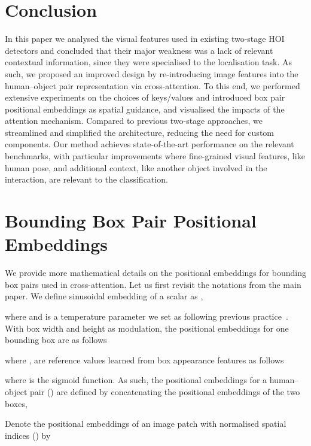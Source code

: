 \documentclass[10pt,twocolumn,letterpaper]{article}
\begin{document}
\section{Conclusion}

In this paper we analysed the visual features used in existing two-stage HOI detectors and concluded that their major weakness was a lack of relevant contextual information, since they were specialised to the localisation task. As such, we proposed an improved design by re-introducing image features into the human--object pair representation via cross-attention. To this end, we performed extensive experiments on the choices of keys/values and introduced box pair positional embeddings as spatial guidance, and visualised the impacts of the attention mechanism. Compared to previous two-stage approaches, we streamlined and simplified the architecture, reducing the need for custom components. Our method achieves state-of-the-art performance on the relevant benchmarks, with particular improvements where fine-grained visual features, like human pose, and additional context, like another object involved in the interaction, are relevant to the classification.

\newpage

{\small


}

\newpage
\appendix

\section{Bounding Box Pair Positional Embeddings}

We provide more mathematical details on the positional embeddings for bounding box pairs used in cross-attention. Let us first revisit the notations from the main paper. We define sinusoidal embedding of a scalar as ,

where  and  is a temperature parameter we set as  following previous practice~\cite{dab-detr}. With box width and height as modulation, the positional embeddings for one bounding box are as follows

where ,  are reference values learned from box appearance features  as follows

where  is the sigmoid function. As such, the positional embeddings for a human--object pair () are defined by concatenating the positional embeddings of the two boxes,

Denote the positional embeddings of an image patch with normalised spatial indices () by
\end{document}
